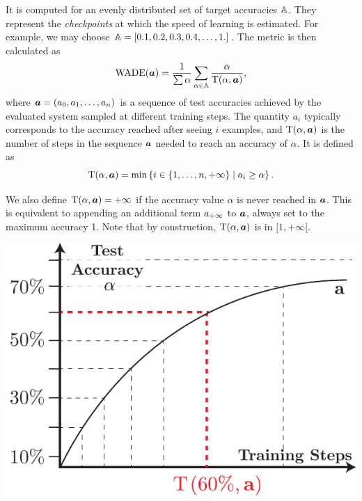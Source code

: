 \begin{minipage}[htbp]{.65\linewidth}
It is computed for an evenly distributed set of target accuracies ${\mathbb{A}}$. They
represent the \emph{checkpoints} at which the speed of learning is estimated.
For example, we may choose ${\mathbb{A}} = [0.1, 0.2, 0.3, 0.4, \ldots, 1.]$. The metric is
then calculated as
\begin{equation}
\text{WADE}({\bm{a}}) = \frac{1}{\sum \alpha} \sum_{\alpha \in \mathbb{A}}\frac{\alpha}{\text{T}(\alpha, {\bm{a}})},
\label{eq:wade}
\end{equation}
where ${\bm{a}} = ({a}_{0}, {a}_{1}, \ldots, {a}_{n})$ is a sequence of test accuracies achieved by the evaluated system
sampled at different training steps. The quantity $a_{i}$ typically
corresponds to the accuracy reached after seeing $i$ examples, and
$\text{T}(\alpha, {\bm{a}})$ is the number of steps in the sequence ${\bm{a}}$ needed to reach
an accuracy of $\alpha$. It is defined as
\begin{equation}
  \text{T}(\alpha, {\bm{a}}) = \min\left\{ i \in \{1, \ldots, n, + \infty \}\; |\; a_{i} \geq \alpha \right\}.
\label{eq:tto}
\end{equation}

We also define $\text{T}(\alpha, {\bm{a}}) = +\infty$ if the accuracy value $\alpha$ is never
reached in ${\bm{a}}$. This is equivalent to appending an additional term ${a}_{+\infty}$
to ${\bm{a}}$, always set to the maximum accuracy 1. Note that by construction,
$\text{T}(\alpha, {\bm{a}})$ is in $[1, + \infty [$.
\end{minipage}
\hfill
\begin{minipage}[htbp]{.330\linewidth}
 \includegraphics[width=.9\linewidth]{figures/metric_tto}
 \vspace{-7pt}
  \label{fig:metric_tto}
\end{minipage}


